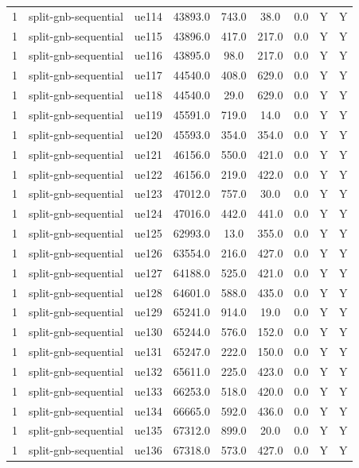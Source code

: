 \begin{table}[ht]
\begin{tabular}{|c|c|c|c|c|c|c|c|c|}
1 & split-gnb-sequential & ue114 & 43893.0 & 743.0 & 38.0 & 0.0 & Y & Y \\
1 & split-gnb-sequential & ue115 & 43896.0 & 417.0 & 217.0 & 0.0 & Y & Y \\
1 & split-gnb-sequential & ue116 & 43895.0 & 98.0 & 217.0 & 0.0 & Y & Y \\
1 & split-gnb-sequential & ue117 & 44540.0 & 408.0 & 629.0 & 0.0 & Y & Y \\
1 & split-gnb-sequential & ue118 & 44540.0 & 29.0 & 629.0 & 0.0 & Y & Y \\
1 & split-gnb-sequential & ue119 & 45591.0 & 719.0 & 14.0 & 0.0 & Y & Y \\
1 & split-gnb-sequential & ue120 & 45593.0 & 354.0 & 354.0 & 0.0 & Y & Y \\
1 & split-gnb-sequential & ue121 & 46156.0 & 550.0 & 421.0 & 0.0 & Y & Y \\
1 & split-gnb-sequential & ue122 & 46156.0 & 219.0 & 422.0 & 0.0 & Y & Y \\
1 & split-gnb-sequential & ue123 & 47012.0 & 757.0 & 30.0 & 0.0 & Y & Y \\
1 & split-gnb-sequential & ue124 & 47016.0 & 442.0 & 441.0 & 0.0 & Y & Y \\
1 & split-gnb-sequential & ue125 & 62993.0 & 13.0 & 355.0 & 0.0 & Y & Y \\
1 & split-gnb-sequential & ue126 & 63554.0 & 216.0 & 427.0 & 0.0 & Y & Y \\
1 & split-gnb-sequential & ue127 & 64188.0 & 525.0 & 421.0 & 0.0 & Y & Y \\
1 & split-gnb-sequential & ue128 & 64601.0 & 588.0 & 435.0 & 0.0 & Y & Y \\
1 & split-gnb-sequential & ue129 & 65241.0 & 914.0 & 19.0 & 0.0 & Y & Y \\
1 & split-gnb-sequential & ue130 & 65244.0 & 576.0 & 152.0 & 0.0 & Y & Y \\
1 & split-gnb-sequential & ue131 & 65247.0 & 222.0 & 150.0 & 0.0 & Y & Y \\
1 & split-gnb-sequential & ue132 & 65611.0 & 225.0 & 423.0 & 0.0 & Y & Y \\
1 & split-gnb-sequential & ue133 & 66253.0 & 518.0 & 420.0 & 0.0 & Y & Y \\
1 & split-gnb-sequential & ue134 & 66665.0 & 592.0 & 436.0 & 0.0 & Y & Y \\
1 & split-gnb-sequential & ue135 & 67312.0 & 899.0 & 20.0 & 0.0 & Y & Y \\
1 & split-gnb-sequential & ue136 & 67318.0 & 573.0 & 427.0 & 0.0 & Y & Y \\

\end{tabular}
\end{table}
